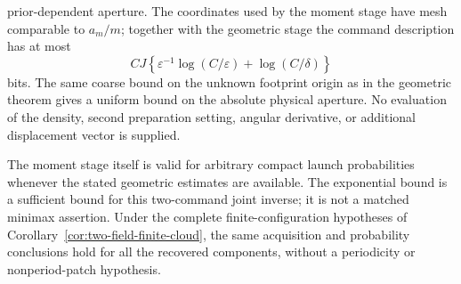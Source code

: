 \begin{theorem}
prior-dependent aperture.  The coordinates used by the moment stage
have mesh comparable to $a_m/m$; together with the geometric stage
the command description has at most
\begin{equation}\label{eq:two-field-joint-description}
 CJ\left\{\varepsilon^{-1}\log(C/\varepsilon)
                            +\log(C/\delta)\right\}
\end{equation}
bits.  The same coarse bound on the unknown footprint origin as in
the geometric theorem gives a uniform bound on the absolute physical
aperture.  No evaluation of the density, second preparation setting,
angular derivative, or additional displacement vector is supplied.

The moment stage itself is valid for arbitrary compact launch
probabilities whenever the stated geometric estimates are available.
The exponential bound is a sufficient bound for this two-command
joint inverse; it is not a matched minimax assertion.  Under the
complete finite-configuration hypotheses of
Corollary~\ref{cor:two-field-finite-cloud}, the same acquisition and
probability conclusions hold for all the recovered components,
without a periodicity or nonperiod-patch hypothesis.
\end{theorem}
